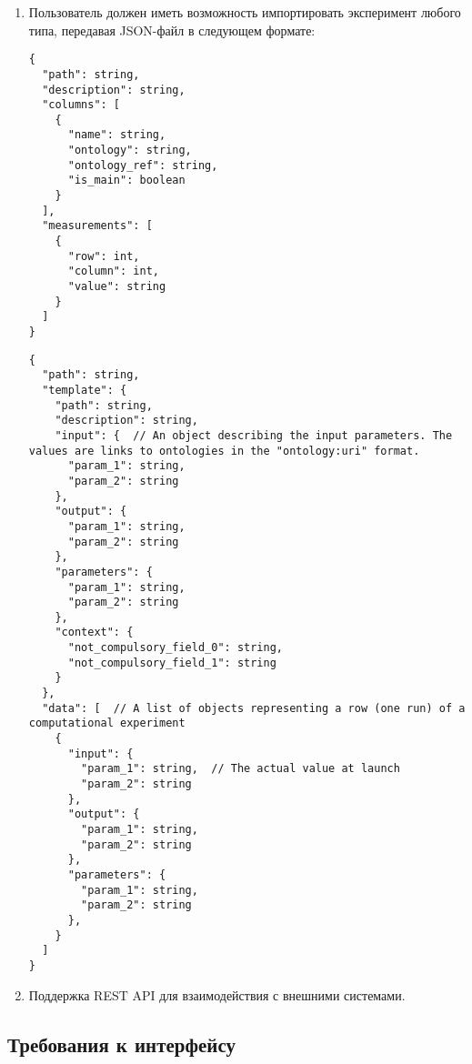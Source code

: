 \documentclass[a4paper,12pt,reqno]{article}
\begin{document}
\begin{enumerate}
        \begin{enumerate}[label=\arabic{enumi}.\arabic*.]
            \item Пользователь должен иметь возможность импортировать эксперимент любого типа, передавая JSON-файл в следующем формате:
            \begin{lstlisting}[frame=single, basicstyle=\footnotesize\ttfamily, label={lst:lab_import}, caption={Формат данных для импорта лабораторого эксперимента},captionpos=b, breaklines=true, breakatwhitespace=true]
{
  "path": string,
  "description": string,
  "columns": [
    {
      "name": string,
      "ontology": string,
      "ontology_ref": string,
      "is_main": boolean
    }
  ],
  "measurements": [
    {
      "row": int,
      "column": int,
      "value": string
    }
  ]
}
            \end{lstlisting}
            \begin{lstlisting}[frame=single, basicstyle=\footnotesize\ttfamily, label={lst:comp_import}, caption={Формат данных для импорта вычислительного эксперимента},captionpos=b, breaklines=true, breakatwhitespace=true]
{
  "path": string,
  "template": {
    "path": string,
    "description": string,
    "input": {  // An object describing the input parameters. The values are links to ontologies in the "ontology:uri" format.
      "param_1": string,
      "param_2": string
    },
    "output": {
      "param_1": string,
      "param_2": string
    },
    "parameters": {
      "param_1": string,
      "param_2": string
    },
    "context": {
      "not_compulsory_field_0": string,
      "not_compulsory_field_1": string
    }
  },
  "data": [  // A list of objects representing a row (one run) of a computational experiment
    {
      "input": {
        "param_1": string,  // The actual value at launch
        "param_2": string
      },
      "output": {
        "param_1": string,
        "param_2": string
      },
      "parameters": {
        "param_1": string,
        "param_2": string
      },
    }
  ]
}
            \end{lstlisting}
            \item Поддержка REST API для взаимодействия с внешними системами.
        \end{enumerate}
    \end{enumerate}

    \subsection{Требования к интерфейсу}
\end{document}
